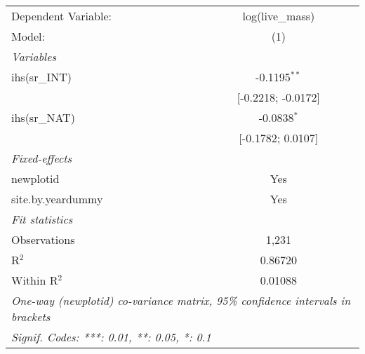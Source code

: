 \begin{tabular}{lc}
\tabularnewline\midrule\midrule
Dependent Variable:&log(live\_mass)\\
Model:&(1)\\
\midrule \emph{Variables}&  \\
ihs(sr\_INT)&-0.1195$^{**}$\\
  &[-0.2218; -0.0172]\\
ihs(sr\_NAT)&-0.0838$^{*}$\\
  &[-0.1782; 0.0107]\\
\midrule \emph{Fixed-effects}&  \\
newplotid & Yes\\
site.by.yeardummy & Yes\\
\midrule \emph{Fit statistics}&  \\
Observations & 1,231\\
R$^2$ & 0.86720\\
Within R$^2$ & 0.01088\\
\midrule\midrule\multicolumn{2}{l}{\emph{One-way (newplotid) co-variance matrix, 95\% confidence intervals in brackets}}\\
\multicolumn{2}{l}{\emph{Signif. Codes: ***: 0.01, **: 0.05, *: 0.1}}\\
\end{tabular}


